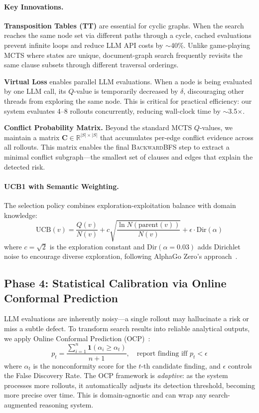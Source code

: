 \documentclass{article}
\begin{document}
\paragraph{Key Innovations.}
\textbf{Transposition Tables (TT)} are essential for cyclic graphs. When the search reaches the same node set via different paths through a cycle, cached evaluations prevent infinite loops and reduce LLM API costs by $\sim$40\%. Unlike game-playing MCTS where states are unique, document-graph search frequently revisits the same clause subsets through different traversal orderings.

\textbf{Virtual Loss} enables parallel LLM evaluations. When a node is being evaluated by one LLM call, its $Q$-value is temporarily decreased by $\delta$, discouraging other threads from exploring the same node. This is critical for practical efficiency: our system evaluates 4--8 rollouts concurrently, reducing wall-clock time by $\sim$3.5$\times$.

\textbf{Conflict Probability Matrix.} Beyond the standard MCTS $Q$-values, we maintain a matrix $\mathbf{C} \in \mathbb{R}^{|S| \times |S|}$ that accumulates per-edge conflict evidence across all rollouts. This matrix enables the final \textsc{BackwardBFS} step to extract a minimal conflict subgraph---the smallest set of clauses and edges that explain the detected risk.

\paragraph{UCB1 with Semantic Weighting.} The selection policy combines exploration-exploitation balance with domain knowledge:
\begin{equation}
\text{UCB}(v) = \frac{Q(v)}{N(v)} + c \sqrt{\frac{\ln N(\text{parent}(v))}{N(v)}} + \epsilon \cdot \text{Dir}(\alpha)
\end{equation}
where $c = \sqrt{2}$ is the exploration constant and $\text{Dir}(\alpha=0.03)$ adds Dirichlet noise to encourage diverse exploration, following AlphaGo Zero's approach~\cite{alpha}.

\subsection{Phase 4: Statistical Calibration via Online Conformal Prediction}

LLM evaluations are inherently noisy---a single rollout may hallucinate a risk or miss a subtle defect. To transform search results into reliable analytical outputs, we apply Online Conformal Prediction (OCP)~\cite{conformal}:
\begin{equation}
    p_t = \frac{\sum_{i=1}^{n} \mathbf{1}(\alpha_i \ge \alpha_t)}{n+1}, \quad \text{report finding iff } p_t < \epsilon
\end{equation}
where $\alpha_t$ is the nonconformity score for the $t$-th candidate finding, and $\epsilon$ controls the False Discovery Rate. The OCP framework is \emph{adaptive}: as the system processes more rollouts, it automatically adjusts its detection threshold, becoming more precise over time. This is domain-agnostic and can wrap any search-augmented reasoning system.
\end{document}
